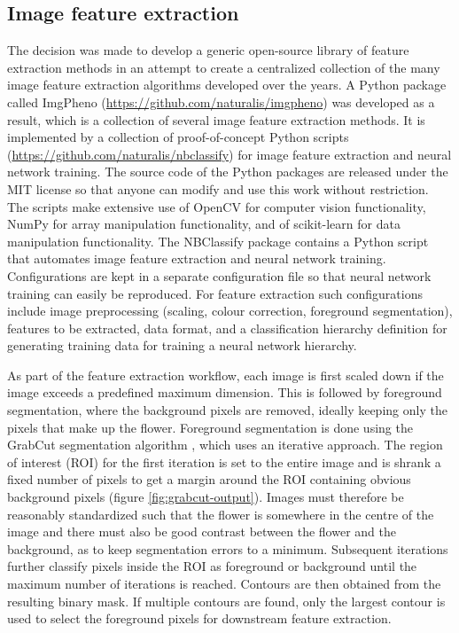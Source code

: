 \documentclass[twocolumn]{bmcart}
\begin{document}
\subsection{Image feature extraction}

The decision was made to develop a generic open-source library of feature extraction methods in an attempt to create a centralized collection of the many image feature extraction algorithms developed over the years. A Python package called ImgPheno (\url{https://github.com/naturalis/imgpheno}) was developed as a result, which is a collection of several image feature extraction methods. It is implemented by a collection of proof-of-concept Python scripts (\url{https://github.com/naturalis/nbclassify}) for image feature extraction and neural network training. The source code of the Python packages are released under the MIT license so that anyone can modify and use this work without restriction. The scripts make extensive use of OpenCV \cite{Pulli2012} for computer vision functionality, NumPy \cite{VanderWalt2011} for array manipulation functionality, and of scikit-learn \cite{Pedregosa2011} for data manipulation functionality. The NBClassify package contains a Python script that automates image feature extraction and neural network training. Configurations are kept in a separate configuration file so that neural network training can easily be reproduced. For feature extraction such configurations include image preprocessing (scaling, colour correction, foreground segmentation), features to be extracted, data format, and a classification hierarchy definition for generating training data for training a neural network hierarchy.

As part of the feature extraction workflow, each image is first scaled down if the image exceeds a predefined maximum dimension. This is followed by foreground segmentation, where the background pixels are removed, ideally keeping only the pixels that make up the flower. Foreground segmentation is done using the GrabCut segmentation algorithm \cite{Rother2004}, which uses an iterative approach. The region of interest (ROI) for the first iteration is set to the entire image and is shrank a fixed number of pixels to get a margin around the ROI containing obvious background pixels (figure \ref{fig:grabcut-output}). Images must therefore be reasonably standardized such that the flower is somewhere in the centre of the image and there must also be good contrast between the flower and the background, as to keep segmentation errors to a minimum. Subsequent iterations further classify pixels inside the ROI as foreground or background until the maximum number of iterations is reached. Contours are then obtained from the resulting binary mask. If multiple contours are found, only the largest contour is used to select the foreground pixels for downstream feature extraction.
\end{document}
